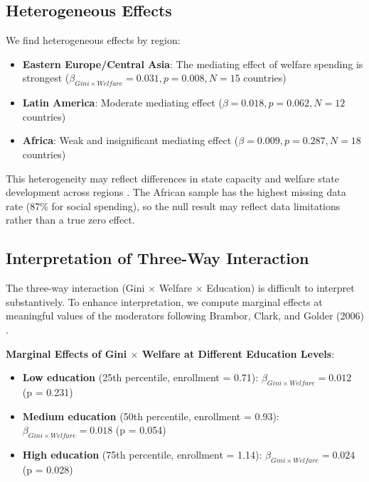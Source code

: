 \documentclass[11pt,letterpaper]{article}
\begin{document}
\subsection{Heterogeneous Effects}

We find heterogeneous effects by region:

\begin{itemize}
  \item \textbf{Eastern Europe/Central Asia}: The mediating effect of welfare spending is strongest ($\beta_{Gini \times Welfare} = 0.031, p = 0.008, N = 15$ countries)
  \item \textbf{Latin America}: Moderate mediating effect ($\beta = 0.018, p = 0.062, N = 12$ countries)
  \item \textbf{Africa}: Weak and insignificant mediating effect ($\beta = 0.009, p = 0.287, N = 18$ countries)
\end{itemize}

This heterogeneity may reflect differences in state capacity and welfare state development across regions \cite{Coppedge2024}. The African sample has the highest missing data rate (87\% for social spending), so the null result may reflect data limitations rather than a true zero effect.

\subsection{Interpretation of Three-Way Interaction}

The three-way interaction (Gini $\times$ Welfare $\times$ Education) is difficult to interpret substantively. To enhance interpretation, we compute marginal effects at meaningful values of the moderators following Brambor, Clark, and Golder (2006) \cite{Brambor2006}.

\textbf{Marginal Effects of Gini $\times$ Welfare at Different Education Levels}:

\begin{itemize}
  \item \textbf{Low education} (25th percentile, enrollment = 0.71): $\beta_{Gini \times Welfare} = 0.012$ (p = 0.231)
  \item \textbf{Medium education} (50th percentile, enrollment = 0.93): $\beta_{Gini \times Welfare} = 0.018$ (p = 0.054)
  \item \textbf{High education} (75th percentile, enrollment = 1.14): $\beta_{Gini \times Welfare} = 0.024$ (p = 0.028)
\end{itemize}
\end{document}
